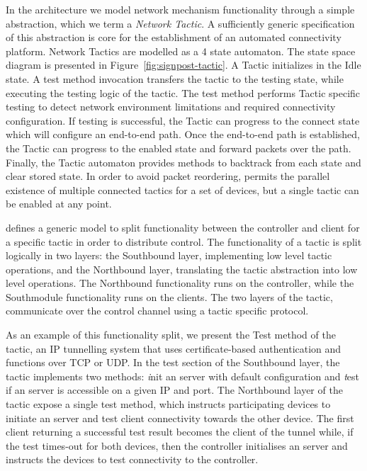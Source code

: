 In the \signpost architecture we model network mechanism 
functionality through a simple abstraction, which we term a
{\it Network Tactic}. A sufficiently generic specification of this abstraction
is core for the establishment of an automated connectivity platform.
\signpost Network Tactics are modelled as a 4 state automaton.  The state space
diagram is presented in Figure~\ref{fig:signpost-tactic}. A Tactic initializes
in the Idle state. A test method invocation transfers the tactic to the testing
state, while executing the testing logic of the tactic. The test method performs
Tactic specific testing to detect network environment limitations and required
connectivity configuration.  If testing is successful, the Tactic can progress
to the connect state which will configure an end-to-end path. Once the
end-to-end path is established, the Tactic can progress to the enabled state and
forward packets over the path.  Finally, the Tactic automaton provides methods
to backtrack from each state and clear stored state. In order to avoid packet
reordering, \signpost permits the parallel existence of multiple connected
tactics for a set of devices, but a single tactic can be enabled at any point. 

\signpost defines a generic model to split functionality between the \signpost
controller and client for a specific tactic in order to distribute control.  The
functionality of a \signpost tactic is split logically in two layers: the
Southbound layer, implementing low level tactic operations, and the Northbound
layer, translating the tactic abstraction into low level operations.  The
Northbound functionality runs on the \signpost controller, while the
Southmodule functionality runs on the \signpost clients. The two layers
of the tactic, communicate over the control channel using a tactic specific
protocol. 

As an example of this functionality split, we present the Test method of the
\openvpn tactic, an IP tunnelling system that uses certificate-based
authentication and functions over TCP or UDP\@. In the test section of the
Southbound layer, the tactic implements two methods: {\emph init} an \openvpn
server with default configuration and {\emph test} if an \openvpn server is
accessible on a given IP and port. The Northbound layer of the tactic expose a
single test method, which instructs participating devices to initiate an
\openvpn server and test client connectivity towards the other device. The first
client returning a successful test result becomes the client of the \openvpn
tunnel while, if the test times-out for both devices, then the controller
initialises an \openvpn server and instructs the devices to test \openvpn
connectivity to the controller.

